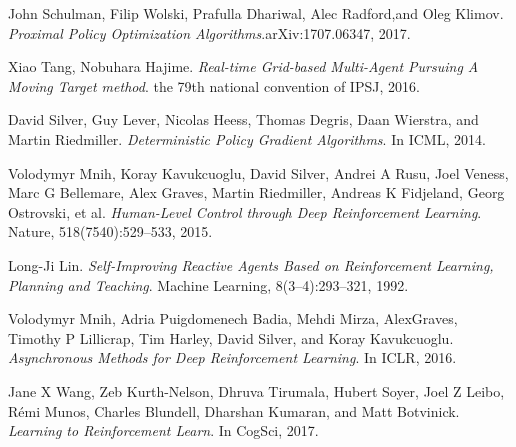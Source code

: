 \documentclass[11pt,twocolumn]{jarticle} %
\begin{document}
\begin{thebibliography}{9}
John Schulman, Filip Wolski, Prafulla Dhariwal, Alec Radford,and Oleg Klimov. \textsl{Proximal Policy Optimization Algorithms}.arXiv:1707.06347, 2017.

Xiao Tang, Nobuhara Hajime. \textsl{Real-time Grid-based Multi-Agent Pursuing A Moving Target method}. the 79th national convention of IPSJ, 2016. 

David Silver, Guy Lever, Nicolas Heess, Thomas Degris, Daan Wierstra, and Martin Riedmiller. \textsl{Deterministic Policy Gradient Algorithms}. In ICML, 2014.

Volodymyr Mnih, Koray Kavukcuoglu, David Silver, Andrei A Rusu, Joel Veness, Marc G Bellemare, Alex Graves, Martin Riedmiller, Andreas K Fidjeland, Georg Ostrovski, et al. \textsl{Human-Level Control through Deep Reinforcement Learning}. Nature, 518(7540):529–533, 2015.

Long-Ji Lin. \textsl{Self-Improving Reactive Agents Based on Reinforcement Learning, Planning and Teaching}. Machine Learning, 8(3–4):293–321, 1992.

Volodymyr Mnih, Adria Puigdomenech Badia, Mehdi Mirza, AlexGraves, Timothy P Lillicrap, Tim Harley, David Silver, and Koray Kavukcuoglu. \textsl{Asynchronous Methods for Deep Reinforcement Learning}. In ICLR, 2016.

Jane X Wang, Zeb Kurth-Nelson, Dhruva Tirumala, Hubert Soyer, Joel Z Leibo, Rémi Munos, Charles Blundell, Dharshan Kumaran, and Matt Botvinick. \textsl{Learning to Reinforcement Learn}. In CogSci, 2017.

\end{thebibliography}
\end{document}
